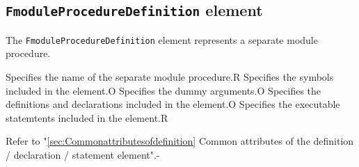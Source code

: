 \subsection{ {\tt FmoduleProcedureDefinition} element}

The {\tt FmoduleProcedureDefinition} element represents a separate module procedure.


\begin{XcodeMLChildElements}
{Specifies the name of  the separate module procedure.}{R}
{Specifies the symbols included in the element.}{O}
{Specifies the dummy arguments.}{O}
{Specifies the definitions and declarations included in the element.}{O}
{Specifies the executable statemtents included in the element.}{R}
\end{XcodeMLChildElements}

\begin{XcodeMLAttributes}
{Refer to "\ref{sec:Commonattributesofdefinition} Common attributes of the definition / declaration / statement element".}{-}
\end{XcodeMLAttributes}

